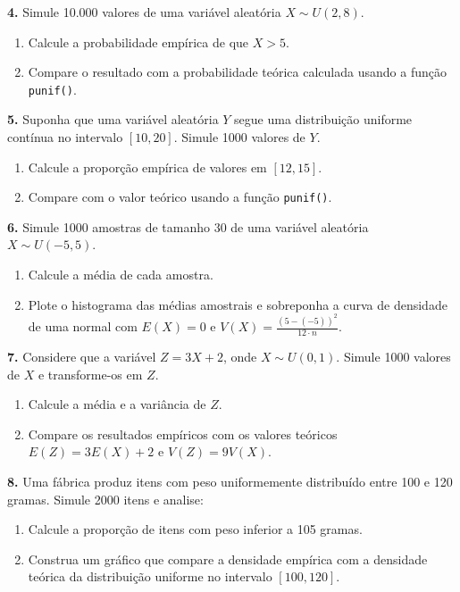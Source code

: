 \documentclass[
]{book}
\begin{document}
\textbf{4.} Simule 10.000 valores de uma variável aleatória \(X \sim U(2, 8)\).

\begin{enumerate}
\def\labelenumi{(\alph{enumi})}
\item
  Calcule a probabilidade empírica de que \(X > 5\).
\item
  Compare o resultado com a probabilidade teórica calculada usando a função \texttt{punif()}.
\end{enumerate}

\textbf{5.} Suponha que uma variável aleatória \(Y\) segue uma distribuição uniforme contínua no intervalo \([10, 20]\). Simule 1000 valores de \(Y\).

\begin{enumerate}
\def\labelenumi{(\alph{enumi})}
\item
  Calcule a proporção empírica de valores em \([12, 15]\).
\item
  Compare com o valor teórico usando a função \texttt{punif()}.
\end{enumerate}

\textbf{6.} Simule 1000 amostras de tamanho 30 de uma variável aleatória \(X \sim U(-5, 5)\).

\begin{enumerate}
\def\labelenumi{(\alph{enumi})}
\item
  Calcule a média de cada amostra.
\item
  Plote o histograma das médias amostrais e sobreponha a curva de densidade de uma normal com \(E(X) = 0\) e \(V(X) = \frac{(5 - (-5))^2}{12 \cdot n}\).
\end{enumerate}

\textbf{7.} Considere que a variável \(Z = 3X + 2\), onde \(X \sim U(0, 1)\). Simule 1000 valores de \(X\) e transforme-os em \(Z\).

\begin{enumerate}
\def\labelenumi{(\alph{enumi})}
\item
  Calcule a média e a variância de \(Z\).
\item
  Compare os resultados empíricos com os valores teóricos \(E(Z) = 3E(X) + 2\) e \(V(Z) = 9V(X)\).
\end{enumerate}

\textbf{8.} Uma fábrica produz itens com peso uniformemente distribuído entre 100 e 120 gramas. Simule 2000 itens e analise:

\begin{enumerate}
\def\labelenumi{(\alph{enumi})}
\item
  Calcule a proporção de itens com peso inferior a 105 gramas.
\item
  Construa um gráfico que compare a densidade empírica com a densidade teórica da distribuição uniforme no intervalo \([100, 120]\).
\end{enumerate}
\end{document}
